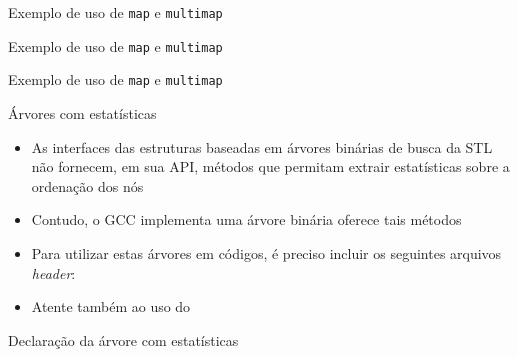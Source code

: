 \begin{frame}[fragile]{Exemplo de uso de \texttt{map} e \texttt{multimap}}
\end{frame}

\begin{frame}[fragile]{Exemplo de uso de \texttt{map} e \texttt{multimap}}
\end{frame}

\begin{frame}[fragile]{Exemplo de uso de \texttt{map} e \texttt{multimap}}
\end{frame}

\begin{frame}[fragile]{Árvores com estatísticas}

    \begin{itemize}
        \item As interfaces das estruturas baseadas em árvores binárias de busca da STL não fornecem,
            em sua API, métodos que permitam extrair estatísticas sobre a ordenação dos nós

        \item Contudo, o GCC implementa uma árvore binária oferece tais métodos

        \item Para utilizar estas árvores em códigos, é preciso incluir os seguintes arquivos
            \textit{header}:


        \item Atente também ao uso do 
    \end{itemize}
\end{frame}

\begin{frame}[fragile]{Declaração da árvore com estatísticas}

\end{frame}

